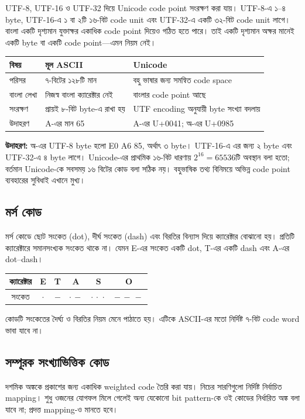 UTF-8, UTF-16 ও UTF-32 দিয়ে Unicode code point সংরক্ষণ করা যায়। UTF-8-এ ১–৪ byte, UTF-16-এ ১ বা ২টি ১৬-বিট code unit এবং UTF-32-এ একটি ৩২-বিট code unit লাগে। বাংলা একটি দৃশ্যমান যুক্তাক্ষর একাধিক code point দিয়েও গঠিত হতে পারে। তাই একটি দৃশ্যমান অক্ষর মানেই একটি byte বা একটি code point—এমন নিয়ম নেই।
\begin{center}\begin{tabularx}{\linewidth}{|L{.24\linewidth}|Y|Y|}\hline
{}বিষয়&মূল ASCII&Unicode\\\hline
পরিসর&৭-বিটের ১২৮টি মান&বহু ভাষার জন্য সমন্বিত code space\\\hline
বাংলা লেখা&নিজস্ব বাংলা ক্যারেক্টার নেই&বাংলার code point আছে\\\hline
সংরক্ষণ&প্রায়ই ৮-বিট byte-এ রাখা হয়&UTF encoding অনুযায়ী byte সংখ্যা বদলায়\\\hline
উদাহরণ&A-এর মান 65&A-এর U+0041; অ-এর U+0985\\\hline
\end{tabularx}\end{center}
\textbf{উদাহরণ:} অ-এর UTF-8 byte হলো \textenglish{E0 A6 85}, অর্থাৎ ৩ byte। UTF-16-এ এর জন্য ২ byte এবং UTF-32-এ ৪ byte লাগে। Unicode-এর প্রাথমিক ১৬-বিট ধারণায় $2^{16}=65536$টি অবস্থান বলা হতো; বর্তমান Unicode-কে সবসময় ১৬ বিটের কোড বলা সঠিক নয়। বহুভাষিক তথ্য বিনিময়ে অভিন্ন code point ব্যবহারের সুবিধাই এখানে মুখ্য।

\subsection{মর্স কোড}
মর্স কোডে ছোট সংকেত (dot), দীর্ঘ সংকেত (dash) এবং বিরতির বিন্যাস দিয়ে ক্যারেক্টার বোঝানো হয়। প্রতিটি ক্যারেক্টারে সমানসংখ্যক সংকেত থাকে না। যেমন E-এর সংকেত একটি dot, T-এর একটি dash এবং A-এর dot–dash।
\begin{center}\begin{tabular}{|c|c|c|c|c|c|}\hline
ক্যারেক্টার&E&T&A&S&O\\\hline
সংকেত&$\cdot$&$-$&$\cdot\,-$&$\cdot\,\cdot\,\cdot$&$-\,-\,-$\\\hline
\end{tabular}\end{center}
কোডটি সংকেতের দৈর্ঘ্য ও বিরতির নিয়ম মেনে পাঠাতে হয়। এটিকে ASCII-এর মতো নির্দিষ্ট ৭-বিট code word ভাবা যাবে না।

\subsection{সম্পূরক সংখ্যাভিত্তিক কোড}
দশমিক অঙ্ককে প্রকাশের জন্য একাধিক weighted code তৈরি করা যায়। নিচের সারণিগুলো নির্দিষ্ট নির্বাচিত mapping। শুধু ওজনের যোগফল মিলে গেলেই অন্য যেকোনো bit pattern-কে ওই কোডের নির্ধারিত অঙ্ক বলা যাবে না; প্রদত্ত mapping-ও মানতে হবে।
